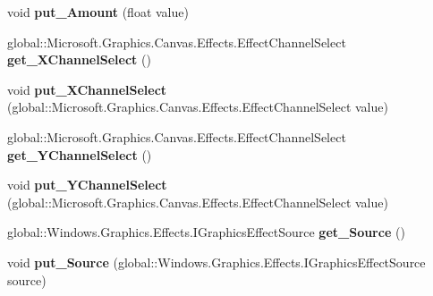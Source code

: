 \begin{DoxyCompactItemize}
void {\bfseries put\+\_\+\+Amount} (float value)
\item 
\mbox{\label{class_microsoft_1_1_graphics_1_1_canvas_1_1_effects_1_1_displacement_map_effect_a9de6395612f22b140d32e3ca061cd2a5}} 
global\+::\+Microsoft.\+Graphics.\+Canvas.\+Effects.\+Effect\+Channel\+Select {\bfseries get\+\_\+\+X\+Channel\+Select} ()
\item 
\mbox{\label{class_microsoft_1_1_graphics_1_1_canvas_1_1_effects_1_1_displacement_map_effect_a17232b9afecc3a3387aba9aa88381baf}} 
void {\bfseries put\+\_\+\+X\+Channel\+Select} (global\+::\+Microsoft.\+Graphics.\+Canvas.\+Effects.\+Effect\+Channel\+Select value)
\item 
\mbox{\label{class_microsoft_1_1_graphics_1_1_canvas_1_1_effects_1_1_displacement_map_effect_a054ea7ca343451632990c0ba5745cb36}} 
global\+::\+Microsoft.\+Graphics.\+Canvas.\+Effects.\+Effect\+Channel\+Select {\bfseries get\+\_\+\+Y\+Channel\+Select} ()
\item 
\mbox{\label{class_microsoft_1_1_graphics_1_1_canvas_1_1_effects_1_1_displacement_map_effect_a16f640070ff4f567c8c7c530557b8c10}} 
void {\bfseries put\+\_\+\+Y\+Channel\+Select} (global\+::\+Microsoft.\+Graphics.\+Canvas.\+Effects.\+Effect\+Channel\+Select value)
\item 
\mbox{\label{class_microsoft_1_1_graphics_1_1_canvas_1_1_effects_1_1_displacement_map_effect_af69fbee08f58e40ff331229945a58a92}} 
global\+::\+Windows.\+Graphics.\+Effects.\+I\+Graphics\+Effect\+Source {\bfseries get\+\_\+\+Source} ()
\item 
\mbox{\label{class_microsoft_1_1_graphics_1_1_canvas_1_1_effects_1_1_displacement_map_effect_a111bf667fceee07085a750745d777c13}} 
void {\bfseries put\+\_\+\+Source} (global\+::\+Windows.\+Graphics.\+Effects.\+I\+Graphics\+Effect\+Source source)

\end{DoxyCompactItemize}
